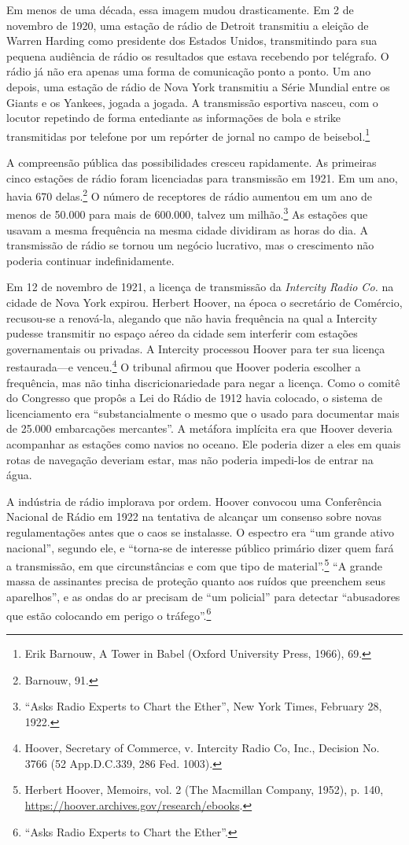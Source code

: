 \documentclass{book}
\newcommand{\ingles}[1]{\textit{#1}}
\begin{document}
Em menos de uma década, essa imagem mudou drasticamente. Em 2 de novembro de 1920,
uma estação de rádio de Detroit transmitiu a eleição de Warren Harding como
presidente dos Estados Unidos, transmitindo para sua pequena audiência de rádio
os resultados que estava recebendo por telégrafo. O rádio já não era apenas uma
forma de comunicação ponto a ponto. Um ano depois, uma estação de rádio de Nova
York transmitiu a Série Mundial entre os Giants e os Yankees, jogada a jogada. A
transmissão esportiva nasceu, com o locutor repetindo de forma entediante as
informações de bola e strike transmitidas por telefone por um repórter de jornal
no campo de beisebol.\footnote{Erik Barnouw, A Tower in Babel (Oxford University
 Press, 1966), 69.}

A compreensão pública das possibilidades cresceu rapidamente. As primeiras cinco
estações de rádio foram licenciadas para transmissão em 1921. Em um ano, havia
670 delas.\footnote{Barnouw, 91.} O número de receptores de rádio aumentou em um
ano de menos de 50.000 para mais de 600.000, talvez um milhão.\footnote{``Asks
Radio Experts to Chart the Ether'', New York Times, February 28, 1922.} As estações
que usavam a mesma frequência na mesma cidade dividiram as horas do dia. A transmissão
de rádio se tornou um negócio lucrativo, mas o crescimento não poderia continuar
indefinidamente.

Em 12 de novembro de 1921, a licença de transmissão da \ingles{Intercity Radio
Co.} na cidade de Nova York expirou. Herbert Hoover, na época o secretário de
Comércio, recusou-se a renová-la, alegando que não havia frequência na qual a
Intercity pudesse transmitir no espaço aéreo da cidade sem interferir com estações
governamentais ou privadas. A Intercity processou Hoover para ter sua licença
restaurada---e venceu.\footnote{Hoover, Secretary of Commerce, v. Intercity Radio
Co, Inc., Decision No. 3766 (52 App.D.C.339, 286 Fed. 1003).} O tribunal afirmou
que Hoover poderia escolher a frequência, mas não tinha discricionariedade para
negar a licença. Como o comitê do Congresso que propôs a Lei do Rádio de 1912
havia colocado, o sistema de licenciamento era ``substancialmente o mesmo que o
usado para documentar mais de 25.000 embarcações mercantes''. A metáfora implícita
era que Hoover deveria acompanhar as estações como navios no oceano. Ele poderia
dizer a eles em quais rotas de navegação deveriam estar, mas não poderia impedi-los
de entrar na água.

A indústria de rádio implorava por ordem. Hoover convocou uma Conferência Nacional
de Rádio em 1922 na tentativa de alcançar um consenso sobre novas regulamentações
antes que o caos se instalasse. O espectro era ``um grande ativo nacional'',
segundo ele, e ``torna-se de interesse público primário dizer quem fará a
transmissão, em que circunstâncias e com que tipo de material''.\footnote{Herbert
Hoover, Memoirs, vol. 2 (The Macmillan Company, 1952), p. 140,
\url{https://hoover.archives.gov/research/ebooks}.}
``A grande massa de assinantes precisa de proteção quanto aos ruídos que preenchem
seus aparelhos'', e as ondas do ar precisam de ``um policial'' para detectar
``abusadores que estão colocando em perigo o tráfego''.\footnote{``Asks Radio
Experts to Chart the Ether''.}
\end{document}
